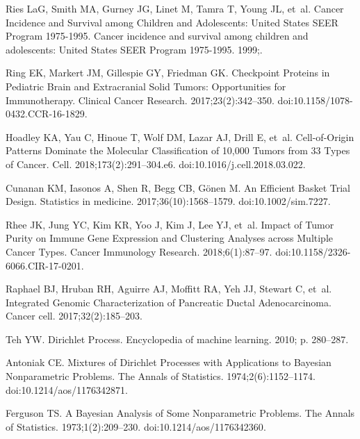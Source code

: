 \documentclass[10pt,letterpaper]{article}
\begin{document}
\begin{thebibliography}{10}
	Ries LaG, Smith MA, Gurney JG, Linet M, Tamra T, Young JL, et~al.
	\newblock Cancer Incidence and Survival among Children and Adolescents:
	{{United States SEER Program}} 1975-1995.
	\newblock Cancer incidence and survival among children and adolescents: United
	States SEER Program 1975-1995. 1999;.
	
	Ring EK, Markert JM, Gillespie GY, Friedman GK.
	\newblock Checkpoint {{Proteins}} in {{Pediatric Brain}} and {{Extracranial
			Solid Tumors}}: {{Opportunities}} for {{Immunotherapy}}.
	\newblock Clinical Cancer Research. 2017;23(2):342--350.
	\newblock doi:{10.1158/1078-0432.CCR-16-1829}.
	
	Hoadley KA, Yau C, Hinoue T, Wolf DM, Lazar AJ, Drill E, et~al.
	\newblock Cell-of-{{Origin Patterns Dominate}} the {{Molecular Classification}}
	of 10,000 {{Tumors}} from 33 {{Types}} of {{Cancer}}.
	\newblock Cell. 2018;173(2):291--304.e6.
	\newblock doi:{10.1016/j.cell.2018.03.022}.
	
	Cunanan KM, Iasonos A, Shen R, Begg CB, G{\"o}nen M.
	\newblock An {{Efficient Basket Trial Design}}.
	\newblock Statistics in medicine. 2017;36(10):1568--1579.
	\newblock doi:{10.1002/sim.7227}.
	
	Rhee JK, Jung YC, Kim KR, Yoo J, Kim J, Lee YJ, et~al.
	\newblock Impact of {{Tumor Purity}} on {{Immune Gene Expression}} and
	{{Clustering Analyses}} across {{Multiple Cancer Types}}.
	\newblock Cancer Immunology Research. 2018;6(1):87--97.
	\newblock doi:{10.1158/2326-6066.CIR-17-0201}.
	
	Raphael BJ, Hruban RH, Aguirre AJ, Moffitt RA, Yeh JJ, Stewart C, et~al.
	\newblock Integrated Genomic Characterization of Pancreatic Ductal
	Adenocarcinoma.
	\newblock Cancer cell. 2017;32(2):185--203.
	
	Teh YW.
	\newblock Dirichlet Process.
	\newblock Encyclopedia of machine learning. 2010; p. 280--287.
	
	Antoniak CE.
	\newblock Mixtures of {{Dirichlet Processes}} with {{Applications}} to
	{{Bayesian Nonparametric Problems}}.
	\newblock The Annals of Statistics. 1974;2(6):1152--1174.
	\newblock doi:{10.1214/aos/1176342871}.
	
	Ferguson TS.
	\newblock A {{Bayesian Analysis}} of {{Some Nonparametric Problems}}.
	\newblock The Annals of Statistics. 1973;1(2):209--230.
	\newblock doi:{10.1214/aos/1176342360}.
	

\end{thebibliography}
\end{document}

